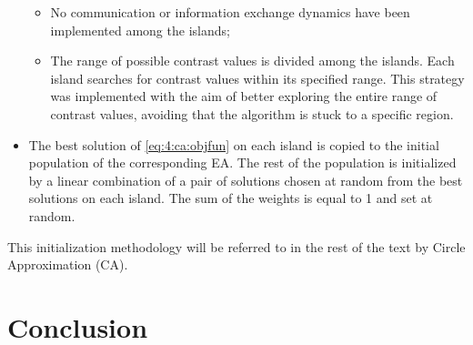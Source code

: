 \begin{itemize}
				\begin{itemize}
					\item No communication or information exchange dynamics have been implemented among the islands;
					\item The range of possible contrast values is divided among the islands. Each island searches for contrast values within its specified range. This strategy was implemented with the aim of better exploring the entire range of contrast values, avoiding that the algorithm is stuck to a specific region.
				\end{itemize}
				\item The best solution of \eqref{eq:4:ca:objfun} on each island is copied to the initial population of the corresponding EA. The rest of the population is initialized by a linear combination of a pair of solutions chosen at random from the best solutions on each island. The sum of the weights is equal to 1 and set at random.
			\end{itemize}
			
			This initialization methodology will be referred to in the rest of the text by Circle Approximation (CA).
		
	\section{Conclusion}\label{chap:investigation:conclusion}
	
